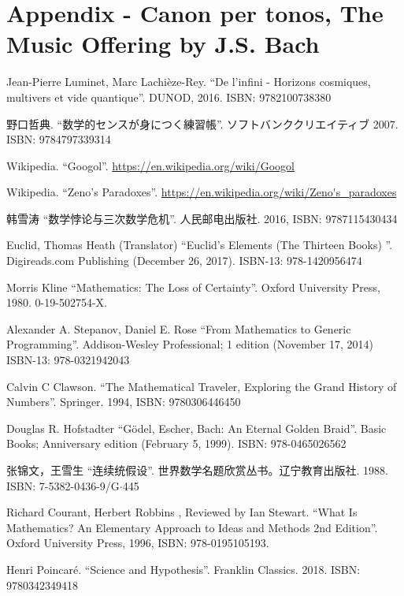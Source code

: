 \documentclass{article}
\begin{document}

\section{Appendix - Canon per tonos, The Music Offering by J.S. Bach}



\ifx\wholebook\relax \else
\begin{thebibliography}{99}

Jean-Pierre Luminet, Marc Lachièze-Rey. ``De l'infini - Horizons cosmiques, multivers et vide quantique''. DUNOD, 2016. ISBN: 9782100738380

{\fontspec{\cnmainft}野口哲典. ``数学的センスが身につく練習帳''. ソフトバンククリエイティブ} 2007. ISBN: 9784797339314

Wikipedia. ``Googol''. \url{https://en.wikipedia.org/wiki/Googol}

Wikipedia. ``Zeno's Paradoxes''. \url{https://en.wikipedia.org/wiki/Zeno's_paradoxes}

{\fontspec{\cnmainft}韩雪涛 ``数学悖论与三次数学危机''. 人民邮电出版社.} 2016, ISBN: 9787115430434

Euclid, Thomas Heath (Translator) ``Euclid's Elements (The Thirteen Books) ''. Digireads.com Publishing (December 26, 2017). ISBN-13: 978-1420956474

Morris Kline ``Mathematics: The Loss of Certainty''. Oxford University Press, 1980. 0-19-502754-X.

Alexander A. Stepanov, Daniel E. Rose ``From Mathematics to Generic Programming''. Addison-Wesley Professional; 1 edition (November 17, 2014) ISBN-13: 978-0321942043

Calvin C Clawson. ``The Mathematical Traveler, Exploring the Grand History of Numbers''. Springer. 1994, ISBN: 9780306446450

Douglas R. Hofstadter ``Gödel, Escher, Bach: An Eternal Golden Braid''. Basic Books; Anniversary edition (February 5, 1999). ISBN: 978-0465026562

{\fontspec{\cnmainft}张锦文，王雪生 ``连续统假设''. 世界数学名题欣赏丛书。辽宁教育出版社.} 1988. ISBN: 7-5382-0436-9/G$\cdot$445

Richard Courant, Herbert Robbins , Reviewed by Ian Stewart. ``What Is Mathematics? An Elementary Approach to Ideas and Methods 2nd Edition''. Oxford University Press,  1996, ISBN: 978-0195105193.

Henri Poincaré. ``Science and Hypothesis''. Franklin Classics. 2018. ISBN: 9780342349418

\end{thebibliography}

\expandafter\enddocument

\fi
\end{document}
